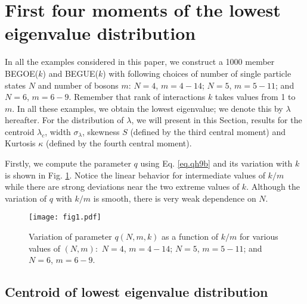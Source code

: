 \section{First four moments of the lowest eigenvalue distribution}
\label{sec2}

In all the examples considered in this paper, we construct a 1000 member BEGOE($k$) and BEGUE($k$) with following choices of number of single particle states $N$ and number of bosons $m$:  $N=4$, $m=4-14$; $N=5$, $m=5-11$; and $N=6$, $m=6-9$.  Remember that rank of interactions $k$ takes values from 1 to $m$.  In all these examples, we obtain the lowest eigenvalue; we denote this by $\lambda$ hereafter.  For the distribution of $\lambda$, we will present in this Section,  results for the centroid $\lambda_c$, width $\sigma_\lambda$, skewness 
$S$ (defined by the third central moment) and Kurtosis $\kappa$ (defined by the fourth central moment).

Firstly, we compute the parameter $q$ using Eq. \eqref{eq.qh9b} and its variation with $k$ is shown in Fig. \ref{fig1}. Notice the linear behavior for intermediate values of $k/m$ while there are strong deviations near the two extreme values of $k$. Although the variation of $q$ with $k/m$ is smooth,  there is very weak dependence on $N$. 

\begin{figure}[tbh]
	\begin{center}
		\texttt{[image: fig1.pdf]}
	\end{center}
	\caption{Variation of parameter $q(N,m,k)$ as a function of $k/m$ for various values of $(N,m): $ $N=4$, $m=4-14$; $N=5$, $m=5-11$; and $N=6$, $m=6-9$.}
	\label{fig1}
\end{figure}

\subsection{Centroid of lowest eigenvalue distribution}

